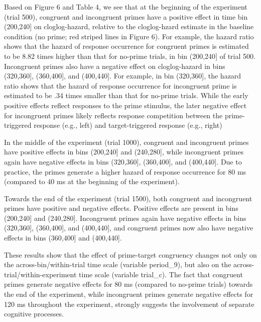 \documentclass[
  man,floatsintext]{apa6}
\begin{document}
Based on Figure 6 and Table 4, we see that at the beginning of the experiment (trial 500), congruent and incongruent primes have a positive effect in time bin (200,240{]} on cloglog-hazard, relative to the cloglog-hzard estimate in the baseline condition (no prime; red striped lines in Figure 6). For example, the hazard ratio shows that the hazard of response occurrence for congruent primes is estimated to be 8.82 times higher than that for no-prime trials, in bin (200,240{]} of trial 500. Incongruent primes also have a negative effect on cloglog-hazard in bins (320,360{]}, (360,400{]}, and (400,440{]}. For example, in bin (320,360{]}, the hazard ratio shows that the hazard of response occurrence for incongruent prime is estimated to be .34 times smaller than that for no-prime trials. While the early positive effects reflect responses to the prime stimulus, the later negative effect for incongruent primes likely reflects response competition between the prime-triggered response (e.g., left) and target-triggered response (e.g., right)

In the middle of the experiment (trial 1000), congruent and incongruent primes have positive effects in bins (200,240{]} and (240,280{]}, while incongruent primes again have negative effects in bins (320,360{]}, (360,400{]}, and (400,440{]}. Due to practice, the primes generate a higher hazard of response occurrence for 80 ms (compared to 40 ms at the beginning of the experiment).

Towards the end of the experiment (trial 1500), both congruent and incongruent primes have positive and negative effects. Positive effects are present in bins (200,240{]} and (240,280{]}. Incongruent primes again have negative effects in bins (320,360{]}, (360,400{]}, and (400,440{]}, and congruent primes now also have negative effects in bins (360,400{]} and (400,440{]}.

These results show that the effect of prime-target congruency changes not only on the across-bin/within-trial time scale (variable period\_9), but also on the across-trial/within-experiment time scale (variable trial\_c). The fact that congruent primes generate negative effects for 80 ms (compared to no-prime trials) towards the end of the experiment, while incongruent primes generate negative effects for 120 ms throughout the experiment, strongly suggests the involvement of separate cognitive processes.
\end{document}

